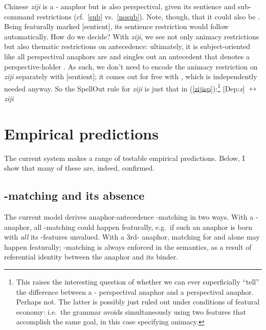 \documentclass[output=paper, modfonts, nonflat]{langsci/langscibook}
\begin{document}
        Chinese \textit{ziji} is a \nul-\person{} anaphor but is also
        perspectival, given its sentience and sub-command restrictions
        (cf.\ \ref{sub} vs.\ \ref{nosub}). Note, though, that it
        could also be . Being featurally marked [sentient], its
        sentience restriction would follow automatically. How do we
        decide?  With \textit{ziji}, we see not only animacy
        restrictions but also thematic restrictions on antecedence:
        ultimately, it is subject-oriented like all perspectival
        anaphors are and singles out an antecedent that denotes a
        perspective-holder \citep{huangliu:2001}.  As such, we don't
        need to encode the animacy restriction on \textit{ziji}
        separately with [sentient]; it comes out for free
        with \dep, which is independently needed anyway. So the
        SpellOut rule for \textit{ziji} is just that in
        (\ref{zijisp}):\footnote{This raises the interesting question
          of whether we can ever superficially ``tell'' the difference
          between a \nul-\person{} perspectival anaphor and a 
          perspectival anaphor. Perhaps not.  The latter is possibly
          just ruled out under conditions of featural economy: i.e.\
          the grammar avoids simultaneously using two features that
          accomplish the same goal, in this case specifying animacy.}
        \ea\label{zijisp} {[}Dep:\textit{x}] $\leftrightarrow$
        \textit{ziji} \z


\section{Empirical predictions}
    \label{secpred}

    The current system makes a range of testable empirical
    predictions. Below, I show that many of these are, indeed,
    confirmed.

\subsection{\texorpdfstring{\ph}{\textphi}-matching and its absence}
  \label{phiabs}


  The current model derives anaphor-antecedence \ph-matching in two
  ways. With a \nul-\person{} anaphor, all \ph-matching could happen
  featurally, e.g.\ if such an anaphor is born with \emph{all} its
  \ph-features unvalued. With a 3rd-\person{} anaphor, matching for
  \num{} and \gender{} alone may happen featurally; \person-matching
  is always enforced in the semantics, as a result of referential
  identity between the anaphor and its binder.
\end{document}
